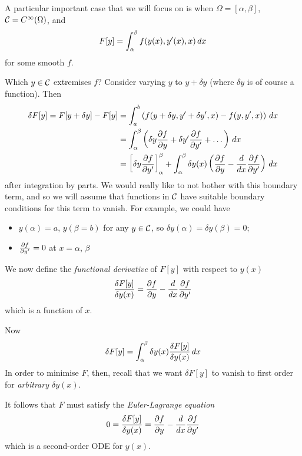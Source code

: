 \documentclass{../template/note}
\begin{document}
    A particular important case that we will focus on is when $\Omega = [\alpha, \beta]$, $\mathcal{C} = C^\infty(\Omega)$, and
    \begin{align*}
        F[y] = \int_\alpha^\beta f(y(x), y'(x), x) \,d{x}
    \end{align*}
    for some smooth $f$.

    Which $y \in \mathcal{C}$ extremises $f$? Consider varying $y$ to $y + \delta y$ (where $\delta y$ is of course a function). Then
    \begin{align*}
        \delta F[y] = F[y+\delta y] - F[y] &= \int_a^b \left(f(y+\delta y, y'+\delta y', x) - f(y, y', x)\right) \D x \\
        &= \int_\alpha^\beta \left(\delta y \pd{f}{y} + \delta y' \pd{f}{y'} + \dots\right) \D x \\
        &= \left[\delta y \pd{f}{y'}\right]_\alpha^\beta + \int_\alpha^\beta \delta y(x) \left(\pd{f}{y} - \frac{d}{dx} \pd{f}{y'}\right) \D x
    \end{align*}
    after integration by parts. We would really like to not bother with this boundary term, and so we will assume that functions in $\mathcal{C}$ have suitable boundary conditions for this term to vanish. For example, we could have
    \begin{itemize}
        \item $y(\alpha) = a$, $y(\beta = b)$ for any $y \in \mathcal{C}$, so $\delta y(\alpha) = \delta y(\beta) = 0$;
        \item $\pd{f}{y'} = 0$ at $x = \alpha$, $\beta$
    \end{itemize}

    \begin{definition}
        We now define the \emph{functional derivative} of $F[y]$ with respect to $y(x)$
        \begin{align*}
            \frac{\delta F[y]}{\delta y(x)} = \pd{f}{y} - \frac{d}{dx} \pd{f}{y'}
        \end{align*}
        which is a function of $x$.
    \end{definition}
    
    Now
    \begin{align*}
        \delta F[y] = \int_\alpha^\beta \delta y(x) \frac{\delta F[y]}{\delta y(x)} \,d{x}
    \end{align*}
    In order to minimise $F$, then, recall that we want $\delta F[y]$ to vanish to first order for \emph{arbitrary $\delta y(x)$}.

    \begin{theorem}    
        It follows that $F$ must satisfy the \emph{Euler-Lagrange equation}
        \begin{align*}
            0 = \frac{\delta F[y]}{\delta y(x)} = \pd{f}{y} - \frac{d}{dx} \pd{f}{y'}
        \end{align*}  
        which is a second-order ODE for $y(x)$.        
    \end{theorem}   
\end{document}
